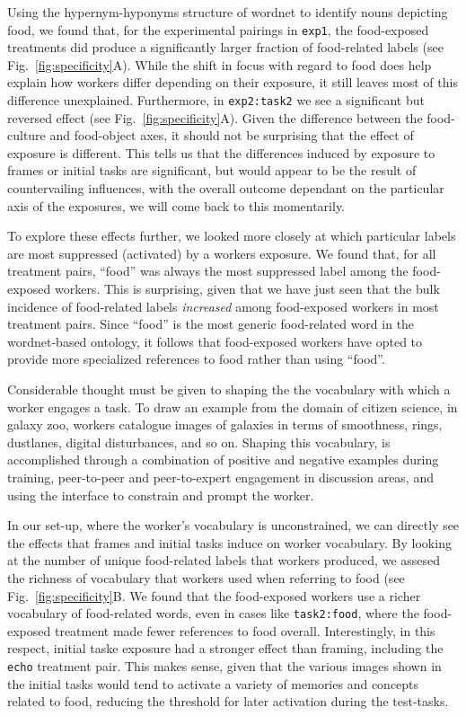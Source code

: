 \documentclass[12pt]{article}
\begin{document}
Using the hypernym-hyponyms structure of wordnet to identify nouns depicting
food, we found that, for the experimental pairings in \texttt{exp1}, the
food-exposed treatments did produce a significantly larger fraction of 
food-related labels (see Fig.~\ref{fig:specificity}A).  While the shift in 
focus with regard to food does help explain how workers differ depending on 
their exposure, it still leaves most of this difference unexplained.
Furthermore, in \texttt{exp2:task2} we see a significant but reversed effect
(see Fig.~\ref{fig:specificity}A).
Given the difference between the food-culture and food-object axes, it should
not be surprising that the effect of exposure is different.  This tells us that
the differences induced by exposure to frames or initial tasks are significant,
but would appear to be the result of countervailing influences, with the
overall outcome dependant on the particular axis of the exposures, we will
come back to this momentarily.

To explore these effects further, we looked more closely at which particular
labels are most suppressed (activated) by a workers exposure.  We found that, 
for all treatment pairs, ``food'' was always the most suppressed label among 
the food-exposed workers.  This is surprising, given that we have just seen 
that the bulk incidence of food-related labels \textit{increased} among 
food-exposed workers in most treatment pairs.
Since ``food'' is the most generic food-related word in the wordnet-based
ontology, it follows that food-exposed workers have opted to provide more
specialized references to food rather than using ``food''.

Considerable thought must be given to shaping the the vocabulary with which
a worker engages a task.  To draw an example from the domain of citizen 
science, in galaxy zoo, workers catalogue images of galaxies in terms of
smoothness, rings, dustlanes, digital disturbances, and so on.  Shaping this
vocabulary, is accomplished through a combination of positive and negative
examples during training, peer-to-peer and peer-to-expert engagement in 
discussion areas, and using the interface to constrain and prompt the 
worker.

In our set-up, where the worker's vocabulary is unconstrained, we can 
directly see the effects that frames and initial tasks induce on worker 
vocabulary.
By looking at the number of unique food-related labels that workers 
produced, we assesed the richness of vocabulary that workers used when 
referring to food (see Fig.~\ref{fig:specificity}B.  We found that the 
food-exposed workers use a richer vocabulary of 
food-related words, even in cases like \texttt{task2:food}, where the 
food-exposed treatment made fewer references to food overall.  
Interestingly, in this respect, initial taske exposure had a stronger effect
than framing, including the \texttt{echo} treatment pair. This makes sense, 
given that the various images shown in the initial
tasks would tend to activate a variety of memories and concepts related to 
food, reducing the threshold for later activation during the test-tasks.
\end{document}
